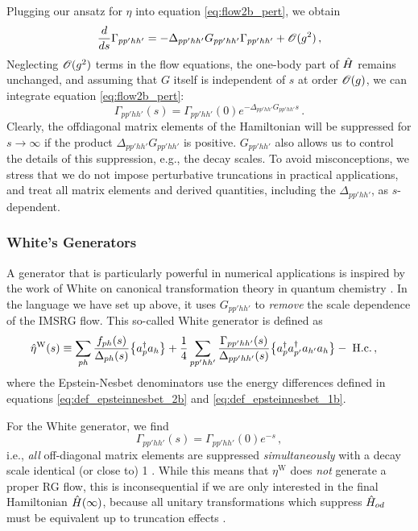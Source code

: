Plugging our ansatz for $\eta$ into equation \eqref{eq:flow2b_pert}, we obtain
\begin{equation}
   \frac{d {}} {d {s}} \Gamma_{pp'hh'} 
  =-\Delta_{pp'hh'}G_{pp'hh'}\Gamma_{pp'hh'} + \mathcal{O}(g^2)\,,
\end{equation}
Neglecting $\mathcal{O}(g^2)$ terms in the flow equations, the one-body part of $\hat{H}$ 
remains unchanged, and assuming that $G$ itself is independent of $s$
at order $\mathcal{O}(g)$, we can integrate equation \eqref{eq:flow2b_pert}:
\begin{equation}\label{eq:Gamma_pert}
  \Gamma_{pp'hh'}(s) = \Gamma_{pp'hh'}(0) e^{-\Delta_{pp'hh'}G_{pp'hh'} s}\,.
\end{equation}
Clearly, the offdiagonal matrix elements of the Hamiltonian will be
suppressed for $s\to\infty$ if the product $\Delta_{pp'hh'} G_{pp'hh'}$ 
is positive. $G_{pp'hh'}$ also allows us
to control the details of this suppression, e.g., the decay scales.
To avoid misconceptions, we stress that we do not impose perturbative
truncations in practical applications, and treat all matrix elements 
and derived quantities, including the $\Delta_{pp'hh'}$, as 
$s$-dependent.

%
%
\subsubsection{\label{sec:imsrg_generator_white}White's Generators}
A generator that is particularly powerful in numerical applications is inspired
by the work of White on canonical transformation theory in quantum chemistry 
\cite{White:2002fk,Tsukiyama:2011uq,Hergert:2016jk}. In the language we have
set up above, it uses $G_{pp'hh'}$ to \emph{remove} the scale dependence
of the IMSRG flow. This so-called White generator is defined as
\begin{align}
  \etaO^\text{W}(s)
  &\equiv\sum_{ph}\frac{f_{ph}(s)}{\Delta_{ph}(s)}\nord{\aaO_{p}\aO_{h}}
  +\frac{1}{4}\sum_{pp'hh'}\frac{\Gamma_{pp'hh'}(s)}{\Delta_{pp'hh'}(s)}
    \nord{\aaO_{p}\aaO_{p'}\aO_{h'}\aO_{h}}-\;\text{H.c.}\label{eq:eta_white}\,,
\end{align}
where the Epstein-Nesbet denominators use the energy differences defined in 
equations \eqref{eq:def_epsteinnesbet_2b} and \eqref{eq:def_epsteinnesbet_1b}.

For the White generator, we find
\begin{equation}
  \Gamma_{pp'hh'}(s) = \Gamma_{pp'hh'}(0) e^{-s}\,,
\end{equation}
i.e., \emph{all} off-diagonal matrix 
elements are suppressed \emph{simultaneously} with a decay scale identical (or close to) 1 
\cite{Hergert:2016jk}. 
While this means that $\eta^\text{W}$ does \emph{not} generate a proper RG
flow, this is inconsequential if we are only interested in the final Hamiltonian 
$\hat{H}(\infty)$, because all unitary transformations which suppress $\hat{H}_{od}$ 
must be equivalent up to truncation effects \cite{Hergert:2016jk}.

